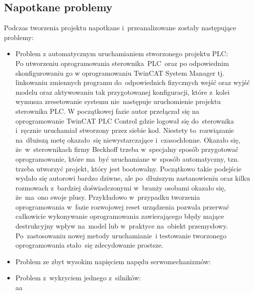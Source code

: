 \subsection{Napotkane problemy}
\label{subsec:problemy}
Podczas tworzenia projektu napotkane i~przeanalizowane zostały następujące problemy:
\begin{itemize}
\item Problem z automatycznym uruchamianiem stworzonego projektu PLC:\\[1mm]
Po utworzeniu oprogramowania sterownika~PLC~oraz po odpowiednim skonfigurowaniu go w oprogramowaniu TwinCAT System Manager tj. linkowaniu zmiennych programu do~odpowiednich fizycznych wejść oraz wyjść modelu oraz aktywowaniu tak przygotowanej konfiguracji, które z~kolei wymusza zresetowanie systemu nie~następuje uruchomienie projektu sterownika PLC. W początkowej fazie autor przełączał się na oprogramowanie TwinCAT PLC Control gdzie logował się do~sterownika i~ręcznie uruchamiał stworzony przez siebie kod. Niestety to~rozwiązanie na~dłuższą metę okazało~się niewystarczające i~czasochłonne. Okazało się, że~w~sterownikach firmy Beckhoff trzeba w~specjalny sposób przygotować oprogramowanie, które ma~być uruchamiane w~sposób automatyczny, tzn. trzeba utworzyć projekt, który jest bootowalny. Początkowo takie podejście wydało się autorowi bardzo dziwne, ale po~dłuższym zastanowieniu oraz kilku rozmowach z~bardziej doświadczonymi w~branży osobami okazało się, że~ma~ono swoje plusy. Przykładowo w~przypadku tworzenia oprogramowania w~fazie rozwojowej reset urządzenia pozwala przerwać całkowicie wykonywanie oprogramowania zawierającego błędy mające destrukcyjny wpływ na~model lub w~praktyce na~obiekt przemysłowy. Po~zastosowaniu nowej metody uruchamianie~i testowanie tworzonego oprogramowania stało~się zdecydowanie prostsze.

\item Problem ze zbyt wysokim napięciem napędu serwomechanizmów:\\[1mm]

\item Problem z~wykryciem jednego z~silników:\\[1mm]
aa


\end{itemize}
